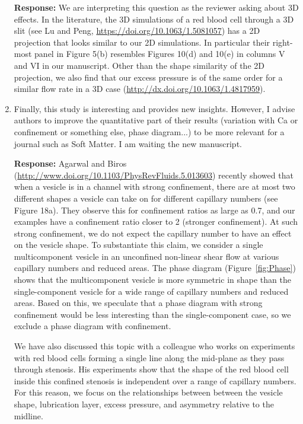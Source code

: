 \documentclass[11pt]{article}
\begin{document}
\begin{enumerate}
\noindent
{\bf Response:} We are interpreting this question as the reviewer asking
about 3D effects. In the literature, the 3D simulations of a red blood
cell through a 3D slit (see Lu and Peng,
\url{https://doi.org/10.1063/1.5081057}) has a 2D projection that looks
similar to our 2D simulations. In particular their right-most panel in
Figure 5(b) resembles Figures 10(d) and 10(e) in columns V and VI in our
manuscript. Other than the shape similarity of the 2D projection, we
also find that our excess pressure is of the same order for a similar
flow rate in a 3D case (\url{http://dx.doi.org/10.1063/1.4817959}).

\item Finally, this study is interesting and provides new insights.
  However, I advise authors to improve the quantitative part of their
  results (variation with Ca or confinement or something else, phase
  diagram...) to be more relevant for a journal such as Soft Matter. I
  am waiting the new manuscript.

\noindent
{\bf Response:} Agarwal and Biros
(\url{http://www.doi.org/10.1103/PhysRevFluids.5.013603})  recently
showed that when a vesicle is in a channel with strong confinement,
there are at most two different shapes a vesicle can take on for
different capillary numbers (see Figure 18a). They observe this for
confinement ratios as large as 0.7, and our examples have a confinement
ratio closer to 2 (stronger confinement). At such strong confinement, we
do not expect the capillary number to have an effect on the vesicle
  shape. To substantiate this claim, we consider a single multicomponent
  vesicle in an unconfined non-linear shear flow at various capillary
  numbers and reduced areas. The phase diagram (Figure~\ref{fig:Phase})
  shows that the multicomponent vesicle is more symmetric in shape than
  the single-component vesicle for a wide range of capillary numbers and
  reduced areas. Based on this, we speculate that a phase diagram with
  strong confinement would be less interesting than the single-component
  case, so we exclude a phase diagram with confinement.

We have also discussed this topic with a colleague who works on
experiments with red blood cells forming a single line along the
mid-plane as they pass through stenosis. His experiments show that the
shape of the red blood cell inside this confined stenosis is independent
over a range of capillary numbers. For this reason, we focus on the
relationships between between the vesicle shape, lubrication layer,
excess pressure, and asymmetry relative to the midline.


\end{enumerate}
\end{document}
